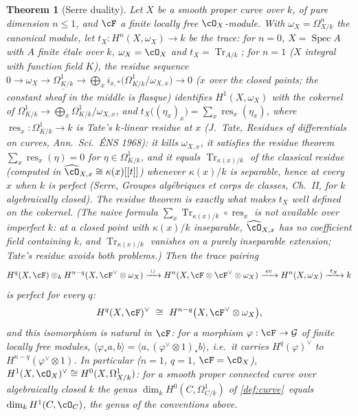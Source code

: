\documentclass[11pt]{article}
\theoremstyle{plain}
\newtheorem{theorem}{Theorem}[section]
\theoremstyle{definition}
\DeclareMathOperator{\Spec}{Spec}
\newcommand{\Cref}[1]{\hyperref[#1]{\ref{#1}}\,\hyperref[#1]{\nameref*{#1}}}
\begin{document}
\begin{theorem}[Serre duality]
\label{thm:picard-duality}
Let $X$ be a smooth proper curve over $k$, of pure dimension
$n\le1$, and $\cF$ a finite locally free $\cO_X$-module.  With
$\omega_X=\Omega^n_{X/k}$ the canonical module, let
$t_X:H^n(X,\omega_X)\to k$ be the \emph{trace}: for $n=0$,
$X=\Spec A$ with $A$ finite \'etale over $k$, $\omega_X=\cO_X$ and
$t_X=\operatorname{Tr}_{A/k}$; for $n=1$ ($X$ integral with function
field $K$), the residue sequence
$0\to\omega_X\to\underline{\Omega^1_{K/k}}\to\bigoplus_{x}i_{x,*}\bigl(\Omega^1_{K/k}/\omega_{X,x}\bigr)\to0$
($x$ over the closed points; the constant sheaf in the middle is flasque) identifies
$H^1(X,\omega_X)$ with the cokernel of
$\Omega^1_{K/k}\to\bigoplus_x\Omega^1_{K/k}/\omega_{X,x}$, and
$t_X\bigl((\eta_x)_x\bigr)=\sum_x\operatorname{res}_x(\eta_x)$, where
$\operatorname{res}_x:\Omega^1_{K/k}\to k$ is Tate's $k$-linear residue
at $x$ (J.~Tate, \emph{Residues of differentials on curves}, Ann.\ Sci.\
\'ENS 1968): it kills $\omega_{X,x}$, it satisfies the residue theorem
$\sum_x\operatorname{res}_x(\eta)=0$ for $\eta\in\Omega^1_{K/k}$, and it
equals $\operatorname{Tr}_{\kappa(x)/k}$ of the classical residue
(computed in $\widehat{\cO}_{X,x}\cong\kappa(x)[[t]]$) whenever
$\kappa(x)/k$ is separable, hence at every $x$ when $k$ is perfect
(Serre, \emph{Groupes alg\'ebriques et corps de classes}, Ch.~II, for
$k$ algebraically closed).  The residue theorem is exactly what makes
$t_X$ well defined on the cokernel.  (The naive formula
$\sum_x\operatorname{Tr}_{\kappa(x)/k}\circ\operatorname{res}_x$ is not
available over imperfect $k$: at a closed point with $\kappa(x)/k$
inseparable, $\widehat{\cO}_{X,x}$ has no coefficient field containing
$k$, and $\operatorname{Tr}_{\kappa(x)/k}$ vanishes on a purely
inseparable extension; Tate's residue avoids both problems.)  Then the
trace pairing
\[
H^q(X,\cF)\otimes_kH^{n-q}(X,\cF^{\vee}\otimes\omega_X)
\xrightarrow{\ \cup\ }H^n(X,\cF\otimes\cF^{\vee}\otimes\omega_X)
\xrightarrow{\ \mathrm{ev}\ }H^n(X,\omega_X)\xrightarrow{\ t_X\ }k
\]
is perfect for every $q$:
\[
H^q(X,\cF)^{\vee}\ \cong\ H^{n-q}\bigl(X,\cF^{\vee}\otimes\omega_X\bigr),
\]
and this isomorphism is natural in $\cF$: for a morphism
$\varphi:\cF\to\mathcal G$ of finite locally free modules,
$\langle\varphi_*a,b\rangle=\langle a,(\varphi^{\vee}\otimes1)_*b\rangle$,
i.e.\ it carries $H^q(\varphi)^{\vee}$ to
$H^{n-q}(\varphi^{\vee}\otimes1)$.  In particular ($n=1$, $q=1$,
$\cF=\cO_X$), $H^1(X,\cO_X)^{\vee}\cong H^0(X,\Omega^1_{X/k})$: for a
smooth proper connected curve over algebraically closed $k$ the genus
$\dim_kH^0(C,\Omega^1_{C/k})$ of \Cref{def:curve} equals
$\dim_kH^1(C,\cO_C)$, the genus of the conventions above.
\end{theorem}
\end{document}
